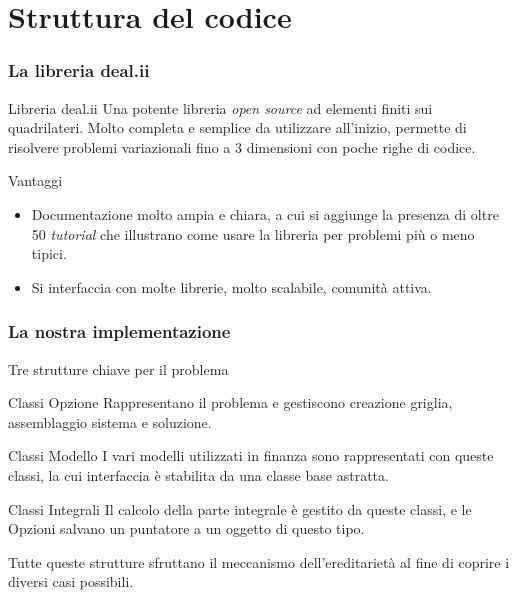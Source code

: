 \documentclass{beamer}
\begin{document}
\section{Struttura del codice}

\begin{frame}
\frametitle{La libreria \textsf{deal.ii}}
\begin{block}{Libreria \textsf{deal.ii}}
Una potente libreria \emph{open source} ad elementi finiti sui quadrilateri. Molto completa e semplice da utilizzare all'inizio, permette di risolvere problemi variazionali fino a 3 dimensioni con poche righe di codice. 
\end{block}
\vspace{0.5cm}
\pause
\begin{block}{Vantaggi}
 \begin{itemize}
  \item Documentazione molto ampia e chiara, a cui si aggiunge la presenza di oltre 50 \emph{tutorial} che illustrano come usare la libreria per problemi pi\`u o meno tipici.
  \item Si interfaccia con molte librerie, molto scalabile, comunit\`a attiva.
 \end{itemize}
\end{block}
\end{frame}

\begin{frame}
\frametitle{La nostra implementazione }
 Tre strutture chiave per il problema
 \begin{block}{Classi Opzione}
Rappresentano il problema e gestiscono creazione griglia, assemblaggio sistema e soluzione.
 \end{block}
 \begin{block}{Classi Modello}
 I vari modelli utilizzati in finanza sono rappresentati con queste classi, la cui interfaccia è stabilita da una classe base astratta.
 \end{block}
 \begin{block}{Classi Integrali}
  Il calcolo della parte integrale è gestito da queste classi, e le Opzioni salvano un puntatore a un oggetto di questo tipo. 
 \end{block}
 Tutte queste strutture sfruttano il meccanismo dell'ereditarietà al fine di coprire i diversi casi possibili.
\end{frame}
\end{document}
